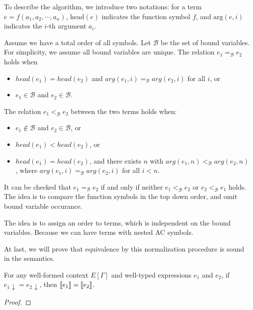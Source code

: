 \documentclass[runningheads]{llncs}
\begin{document}
To describe the algorithm, we introduce two notations: for a term $e = f(a_1, a_2, \cdots, a_n)$, $\textrm{head}(e)$ indicates the function symbol $f$,
and $\textrm{arg}(e, i)$ indicates the $i$-th argument $a_i$. 
\begin{definition}
    Assume we have a total order of all symbols.
    Let $\mathcal{B}$ be the set of bound variables.
    For simplicity, we assume all bound variables are unique.
    The relation $e_1 =_\mathcal{B} e_2$ holds when
    \begin{itemize}
        \item $head(e_1) = head(e_2)$ and $arg(e_1, i) =_\mathcal{B} arg(e_2, i)$ for all $i$, or
        \item $e_1 \in \mathcal{B}$ and $e_2 \in \mathcal{B}$.
    \end{itemize} 

    The relation $e_1 <_\mathcal{B} e_2$ between the two terms holds when:
    \begin{itemize}
        \item $e_1 \notin \mathcal{B}$ and $e_2 \in \mathcal{B}$, or
        \item $head(e_1) < head(e_2)$, or
        \item $head(e_1) = head(e_2)$, and there exists $n$ with $arg(e_1, n) <_\mathcal{B} arg(e_2, n)$, where $arg(e_1, i) =_\mathcal{B} arg(e_2, i)$ for all $i < n$.
    \end{itemize}
\end{definition}
It can be checked that $e_1 =_\mathcal{B} e_2$ if and only if neither $e_1 <_\mathcal{B} e_2$ or $e_2 <_\mathcal{B} e_1$ holds.
The idea is to compare the function symbols in the top down order, and omit bound variable occurance.





The idea is to assign an order to terms, which is independent on the bound variables. Because we can have terms with nested AC symbols.



At last, we will prove that equivalence by this normalization procedure is sound in the semantics. 

\begin{theorem}[soundness]
    For any well-formed context $E[\Gamma]$ and well-typed expressions $e_1$ and $e_2$, if $e_1\downarrow = e_2\downarrow$, then ${\llbracket e_1 \rrbracket} = {\llbracket e_2 \rrbracket}$.
\end{theorem}
\begin{proof}
    
\end{proof}
\end{document}
